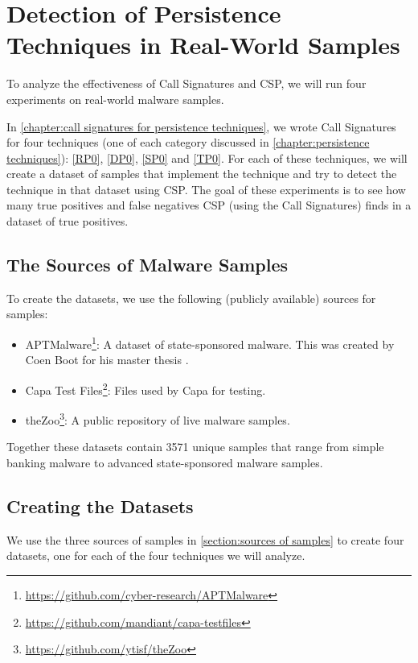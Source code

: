 \section{Detection of Persistence Techniques in Real-World Samples}\label{section:real-world experiments}
To analyze the effectiveness of Call Signatures and CSP, we will run four experiments on real-world malware samples.

In \autoref{chapter:call signatures for persistence techniques}, we wrote Call Signatures for four techniques (one of each category discussed in \autoref{chapter:persistence techniques}): \autoref{RP0}, \autoref{DP0}, \autoref{SP0} and \autoref{TP0}. For each of these techniques, we will create a dataset of samples that implement the technique and try to detect the technique in that dataset using CSP. The goal of these experiments is to see how many true positives and false negatives CSP (using the Call Signatures) finds in a dataset of true positives.

\subsection{The Sources of Malware Samples}\label{section:sources of samples}
To create the datasets, we use the following (publicly available) sources for samples:
\begin{itemize}
    \item APTMalware\footnote{\tiny \url{https://github.com/cyber-research/APTMalware}}: A dataset of state-sponsored malware. This was created by Coen Boot for his master thesis \cite{cboot}.

    \item Capa Test Files\footnote{\tiny \url{https://github.com/mandiant/capa-testfiles}}: Files used by Capa for testing.

    \item theZoo\footnote{\tiny \url{https://github.com/ytisf/theZoo}}: A public repository of live malware samples.
\end{itemize}

Together these datasets contain 3571 unique samples that range from simple banking malware to advanced state-sponsored malware samples.

\subsection{Creating the Datasets}
We use the three sources of samples in \autoref{section:sources of samples} to create four datasets, one for each of the four techniques we will analyze.

